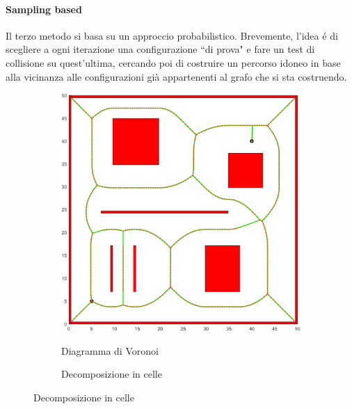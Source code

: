 \documentclass[14pt,a4paper]{extarticle}
\begin{document}
\paragraph{Sampling based} Il terzo metodo si basa su un approccio probabilistico. Brevemente, l'idea é di scegliere a ogni iterazione una configurazione ``di prova" e fare un test di collisione su quest'ultima, cercando poi di costruire un percorso idoneo in base alla vicinanza alle configurazioni già appartenenti al grafo che si sta costruendo. \\

\begin{figure}[H]
\begin{subfigure}[t]{0.5\textwidth}
\centering
\caption{Diagramma di Voronoi}
\includegraphics[width=\textwidth]{voronoi.png}
\label{voronoi}
\end{subfigure}
\hfill
\begin{subfigure}[t]{0.5\textwidth}
\centering
\caption{Decomposizione in celle}

\end{subfigure}
\end{figure}
\end{document}
